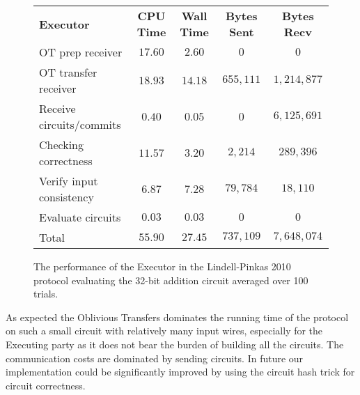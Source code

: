 \documentclass[ %
                    author={Nicholas Tutte},
                supervisor={Prof. Nigel Smart},
                    degree={MEng},
                     title={Secure Two Party Computation},
                  subtitle={A practical comparison of recent protocols},
                      type={Research - GG1K},
                      year={2015} ]{dissertation}
\begin{document}
				\begin{figure}[!ht]
					\begin{tabular}{| p{4.3cm} | c c c c |}
						\hline
						\textbf{Executor} & \textbf{CPU Time} & \textbf{Wall Time} & \textbf{Bytes Sent} & \textbf{Bytes Recv} \\
						\thickhline
						OT prep receiver & $17.60$ & $2.60$ & $0$ & $0$ \\
						\hline
						OT transfer receiver & $18.93$ & $14.18$ & $655,111$ & $1,214,877$ \\
						\hline
						Receive circuits/commits & $0.40$ & $0.05$ & $0$ & $6,125,691$ \\
						\hline
						Checking correctness & $11.57$ & $3.20$ & $2,214$ & $289,396$ \\
						\hline
						Verify input consistency & $6.87$ & $7.28$ & $79,784$ & $18,110$ \\
						\hline
						Evaluate circuits & $0.03$ & $0.03$ & $0$ & $0$ \\
						\thickhline
						Total & $55.90$ & $27.45$ & $737,109$ & $7,648,074$ \\
						\hline
					\end{tabular}
					\caption{The performance of the Executor in the Lindell-Pinkas 2010 protocol evaluating the 32-bit addition circuit averaged over 100 trials.\label{table:LP_2010_Add_Executor}}
				\end{figure}
				\FloatBarrier

				As expected the Oblivious Transfers dominates the running time of the protocol on such a small circuit with relatively many input wires, especially for the Executing party as it does not bear the burden of building all the circuits. The communication costs are dominated by sending circuits. In future our implementation could be significantly improved by using the circuit hash trick for circuit correctness.\\
\end{document}
